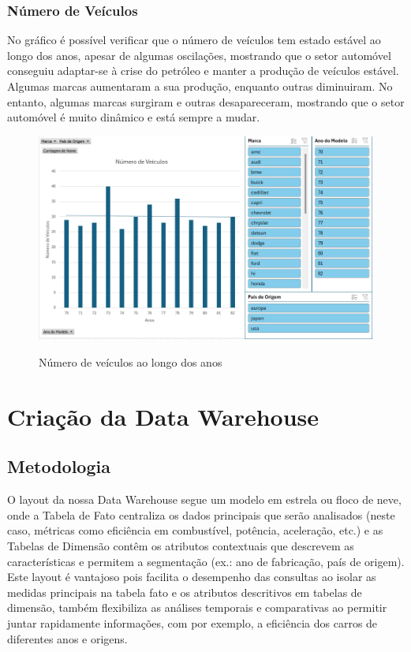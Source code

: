 \documentclass[a4paper]{article}
\begin{document}
\subsubsection{Número de Veículos}
No gráfico é possível verificar que o número de veículos tem estado estável ao longo dos anos, apesar de 
algumas oscilações, mostrando que o setor automóvel conseguiu adaptar-se à crise do petróleo e manter a produção
de veículos estável. Algumas marcas aumentaram a sua produção, enquanto outras diminuiram.
No entanto, algumas marcas surgiram e outras desapareceram, mostrando que o setor automóvel é muito dinâmico e
está sempre a mudar.

\begin{figure}[h!]
    \centering
    \includegraphics[width=1\textwidth]{Recursos/NVeiculosGrafico.png} %
    \vspace{0.5cm}
    \label{fig:nveig}
    \caption{Número de veículos ao longo dos anos}
\end{figure}
\newpage
\section{Criação da Data Warehouse}\label{dwh}
\subsection{Metodologia}
O layout da nossa Data Warehouse segue um modelo em estrela ou floco de neve, onde a Tabela de Fato centraliza os dados principais que serão analisados 
(neste caso, métricas como eficiência em combustível, potência, aceleração, etc.) e as Tabelas de Dimensão contêm os atributos contextuais que descrevem as 
características e permitem a segmentação (ex.: ano de fabricação, país de origem). Este layout é vantajoso pois facilita o desempenho das consultas ao 
isolar as medidas principais na tabela fato e os atributos descritivos em tabelas de dimensão, também flexibiliza as análises temporais e comparativas 
ao permitir juntar rapidamente informações, com por exemplo, a eficiência dos carros de diferentes anos e origens.
\end{document}
